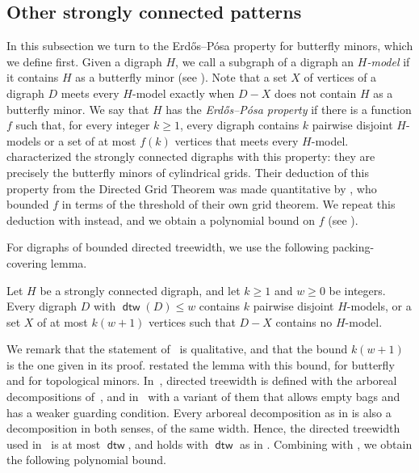 \documentclass[fontsize=12pt,leading=14pt]{fullpaper}
\DeclareMathOperator{\dtw}{\mathsf{dtw}}
\begin{document}
\subsection{Other strongly connected patterns}\label{sec:main-patterns}

In this subsection we turn to the Erd\H{o}s--P\'osa property for butterfly minors, which we define first.
\label{def:pattern-model}Given a digraph $H$, we call a subgraph of a digraph an \emph{$H$-model} if it contains $H$ as a butterfly minor (see ).
Note that a set $X$ of vertices of a digraph $D$ meets every $H$-model exactly when $D-X$ does not contain $H$ as a butterfly minor.
We say that $H$ has the \emph{Erd\H{o}s--P\'osa property} if there is a function $f$ such that, for every integer $k\ge1$, every digraph contains $k$ pairwise disjoint $H$-models or a set of at most $f(k)$ vertices that meets every $H$-model.
\textcite[Theorem~4.1]{AKKW16} characterized the strongly connected digraphs with this property: they are precisely the butterfly minors of cylindrical grids.
Their deduction of this property from the Directed Grid Theorem was made quantitative by \textcite[Theorem~1.6]{HKMM26b}, who bounded $f$ in terms of the threshold of their own grid theorem.
We repeat this deduction with  instead, and we obtain a polynomial bound on $f$ (see ).

For digraphs of bounded directed treewidth, we use the following packing-covering lemma.

\begin{proposition}\label{prop:akkw}
  Let $H$ be a strongly connected digraph, and let $k\ge1$ and $w\ge0$ be integers.
  Every digraph $D$ with $\dtw(D)\le w$ contains $k$ pairwise disjoint $H$-models, or a set $X$ of at most $k(w+1)$ vertices such that $D-X$ contains no $H$-model.
\end{proposition}

We remark that the statement of~\cite[Lemma~4.2]{AKKW16} is qualitative, and that the bound $k(w+1)$ is the one given in its proof.
\textcite[Lemma~1.5]{HKMM26b} restated the lemma with this bound, for butterfly and for topological minors.
In~\cite[Definition~3.5]{AKKW16}, directed treewidth is defined with the arboreal decompositions of~\cite{Johnson2001}, and in~\cite[Definition~2.10]{HKMM26b} with a variant of them that allows empty bags and has a weaker guarding condition.
Every arboreal decomposition as in  is also a decomposition in both senses, of the same width.
Hence, the directed treewidth used in~\cite{AKKW16,HKMM26b} is at most $\dtw$, and  holds with $\dtw$ as in .
Combining  with , we obtain the following polynomial bound.
\end{document}
